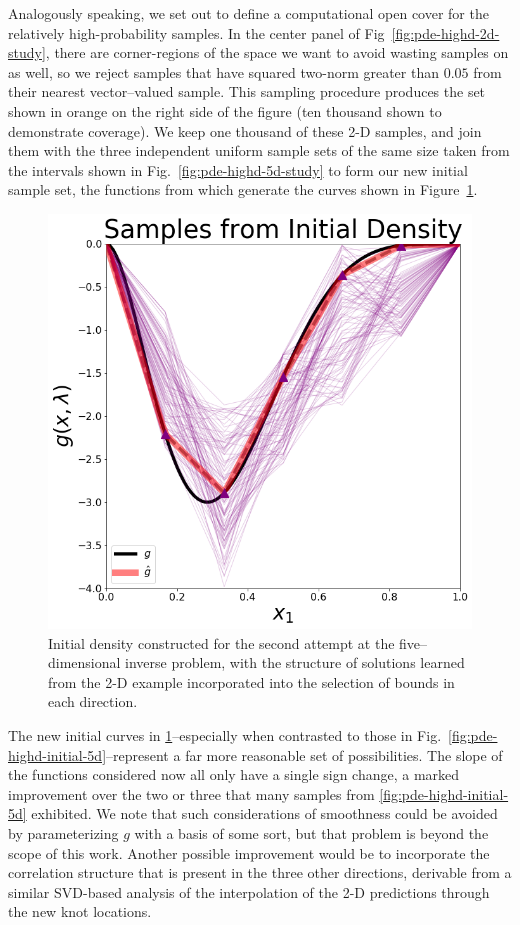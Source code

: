 Analogously speaking, we set out to define a computational open cover for the relatively high-probability samples.
In the center panel of Fig~\ref{fig:pde-highd-2d-study}, there are corner-regions of the space we want to avoid wasting samples on as well, so we reject samples that have squared two-norm greater than $0.05$ from their nearest vector--valued sample.
This sampling procedure produces the set shown in orange on the right side of the figure (ten thousand shown to demonstrate coverage).
We keep one thousand of these 2-D samples, and join them with the three independent uniform sample sets of the same size taken from the intervals shown in Fig.~\ref{fig:pde-highd-5d-study} to form our new initial sample set, the functions from which generate the curves shown in Figure~\ref{fig:pde-highd-alt-initial-5d}.

\begin{figure}[htbp]
\centering
  \includegraphics[width=0.675\linewidth]{figures/pde-highd/pde-highd_init_D5-alt}
\caption{
Initial density constructed for the second attempt at the five--dimensional inverse problem, with the structure of solutions learned from the 2-D example incorporated into the selection of bounds in each direction.
}
\label{fig:pde-highd-alt-initial-5d}
\end{figure}

The new initial curves in \ref{fig:pde-highd-alt-initial-5d}\---especially when contrasted to those in Fig.~\ref{fig:pde-highd-initial-5d}\---represent a far more reasonable set of possibilities.
The slope of the functions considered now all only have a single sign change, a marked improvement over the two or three that many samples from \ref{fig:pde-highd-initial-5d} exhibited.
We note that such considerations of smoothness could be avoided by parameterizing $g$ with a basis of some sort, but that problem is beyond the scope of this work.
Another possible improvement would be to incorporate the correlation structure that is present in the three other directions, derivable from a similar SVD-based analysis of the interpolation of the 2-D predictions through the new knot locations.

